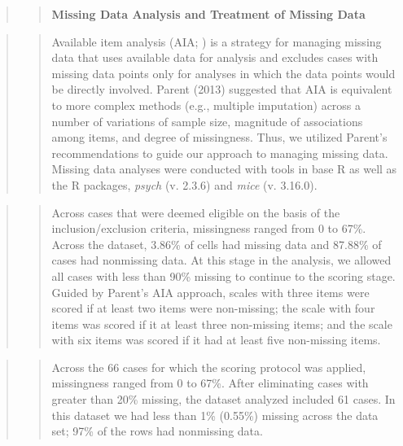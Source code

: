 \documentclass[
  11pt,
]{book}
\begin{document}
\begin{quote}
\begin{quote}
\textbf{Missing Data Analysis and Treatment of Missing Data}
\end{quote}
\end{quote}

\begin{quote}
\begin{quote}
Available item analysis (AIA; \citep{parent_handling_2013}) is a strategy for managing missing data that uses available data for analysis and excludes cases with missing data points only for analyses in which the data points would be directly involved. Parent (2013) suggested that AIA is equivalent to more complex methods (e.g., multiple imputation) across a number of variations of sample size, magnitude of associations among items, and degree of missingness. Thus, we utilized Parent's recommendations to guide our approach to managing missing data. Missing data analyses were conducted with tools in base R as well as the R packages, \emph{psych} (v. 2.3.6) and \emph{mice} (v. 3.16.0).
\end{quote}
\end{quote}

\begin{quote}
\begin{quote}
Across cases that were deemed eligible on the basis of the inclusion/exclusion criteria, missingness ranged from 0 to 67\%. Across the dataset, 3.86\% of cells had missing data and 87.88\% of cases had nonmissing data. At this stage in the analysis, we allowed all cases with less than 90\% missing to continue to the scoring stage. Guided by Parent's \citeyearpar{parent_handling_2013} AIA approach, scales with three items were scored if at least two items were non-missing; the scale with four items was scored if it at least three non-missing items; and the scale with six items was scored if it had at least five non-missing items.
\end{quote}
\end{quote}

\begin{quote}
\begin{quote}
Across the 66 cases for which the scoring protocol was applied, missingness ranged from 0 to 67\%. After eliminating cases with greater than 20\% missing, the dataset analyzed included 61 cases. In this dataset we had less than 1\% (0.55\%) missing across the data set; 97\% of the rows had nonmissing data.
\end{quote}
\end{quote}
\end{document}
